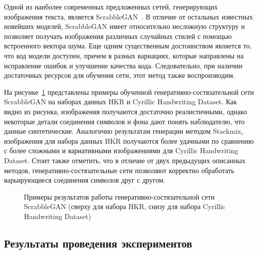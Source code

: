 Одной из наиболее современных предложенных сетей, генерирующих изображения текста, является ScrabbleGAN~\cite{fogel2020scrabblegan}.
В отличие от остальных известных новейших моделей, ScrabbleGAN имеет относительно несложную структуру и позволяет получать
изображения различных случайных стилей с помощью встроенного вектора шума.
Еще одним существенным достоинством является то, что код модели доступен, причем в разных вариациях,
которые направлены на исправление ошибок и улучшение качества кода.
Следовательно, при наличии достаточных ресурсов для обучения сети, этот метод также воспроизводим.

На рисунке~\ref{fig:gan_example} представлены примеры обученной генеративно-состязательной сети ScrabbleGAN на
наборах данных HKR и Cyrillic Handwriting Dataset.
Как видно из рисунка, изображения получаются достаточно реалистичными, однако некоторые детали соединения символов и фона
дают понять наблюдателю, что данные синтетические.
Аналогично результатам генерации методом Stackmix, изображения для набора данных HKR получаются более удачными по сравнению с
более сложными и вариативными изображениями для Cyrillic Handwriting Dataset.
Стоит также отметить, что в отличие от двух предыдущих описанных методов, генеративно-состязательные сети позволяют
корректно обработать варьирующиеся соединения символов друг с другом.

\begin{figure}[h!]
    \centering
    \caption{Примеры результатов работы генеративно-состязательной сети ScrabbleGAN (сверху для набора HKR, снизу для набора Cyrillic Handwriting Dataset)}
    \label{fig:gan_example}
\end{figure}


\subsection{Результаты проведения экспериментов}
\label{subsec:experiments}



